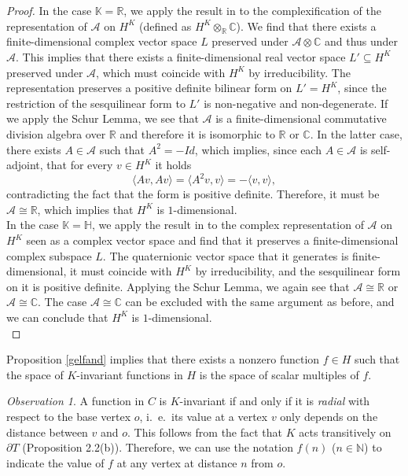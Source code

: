 \documentclass{article}
\theoremstyle{definition}
\theoremstyle{remark}
\newtheorem{obs}[dfn]{Observation}
\theoremstyle{plain}
\begin{document}
\begin{proof}
In the case $\mathbb{K}=\mathbb{R}$, we apply the result in \cite{naimark1} to the complexification of the representation of $\mathcal{A}$ on $H^K$ (defined as $H^K\otimes_\mathbb{R} \mathbb{C}$). We find that there exists a finite-dimensional complex vector space $L$ preserved under $\mathcal{A}\otimes\mathbb{C}$ and thus under $\mathcal{A}$. This implies that there exists a finite-dimensional real vector space $L'\subseteq H^K$ preserved under $\mathcal{A}$, which must coincide with $H^K$ by irreducibility. The representation preserves a positive definite bilinear form on $L'=H^K$, since the restriction of the sesquilinear form to $L'$ is non-negative and non-degenerate. If we apply the Schur Lemma, we see that $\mathcal{A}$ is a finite-dimensional commutative division algebra over $\mathbb{R}$ and therefore it is isomorphic to $\mathbb{R}$ or $\mathbb{C}$. In the latter case, there exists $A\in\mathcal{A}$ such that $A^2=-Id$, which implies, since each $A\in\mathcal{A}$ is self-adjoint, that for every $v\in H^K$ it holds $$\langle Av,Av\rangle=\langle A^2 v,v\rangle=-\langle v,v\rangle,$$ contradicting the fact that the form is positive definite. Therefore, it must be $\mathcal{A}\cong\mathbb{R}$, which implies that $H^K$ is $1$-dimensional. \\

In the case $\mathbb{K}=\mathbb{H}$, we apply the result in \cite{naimark1} to the complex representation of $\mathcal{A}$ on $H^K$ seen as a complex vector space and find that it preserves a finite-dimensional complex subspace $L$. The quaternionic vector space that it generates is finite-dimensional, it must coincide with $H^K$ by irreducibility, and the sesquilinear form on it is positive definite. Applying the Schur Lemma, we again see that $\mathcal{A}\cong\mathbb{R}$ or $\mathcal{A}\cong\mathbb{C}$. The case $\mathcal{A}\cong\mathbb{C}$ can be excluded with the same argument as before, and we can conclude that $H^K$ is $1$-dimensional. \\
\end{proof}

Proposition \ref{gelfand} implies that there exists a nonzero function $f\in H$ such that the space of $K$-invariant functions in $H$ is the space of scalar multiples of $f$. \\

\begin{obs}
A function in $C$ is $K$-invariant if and only if it is \textit{radial} with respect to the base vertex $o$, i.~e.~its value at a vertex $v$ only depends on the distance between $v$ and $o$. This follows from the fact that $K$ acts transitively on $\partial T$ (Proposition 2.2(b)). Therefore, we can use the notation $f(n)$ ($n\in\mathbb{N}$) to indicate the value of $f$ at any vertex at distance $n$ from $o$. \\
\end{obs}
\end{document}
